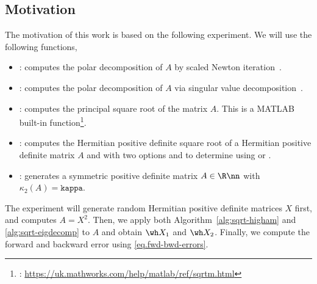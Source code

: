 \subsection{Motivation}
The motivation of this work is based on the following experiment. We will
use the following functions,
\begin{itemize}
\item {}: computes the polar decomposition
of $A$ by scaled Newton iteration~\cite{high-mft}.

\item {}: computes the polar decomposition of
$A$ via singular value decomposition~\cite{high-mft}.

\item {}: computes the principal square root of the
matrix $A$. This is a MATLAB built-in function\footnote{:
  \url{https://uk.mathworks.com/help/matlab/ref/sqrtm.html}}.


\item {}: computes the Hermitian
positive definite square root of a Hermitian positive definite matrix $A$
and with two options  and  to determine
using  or .

\item {}: generates a symmetric positive
definite matrix $A\in\R\nn$ with $\kappa_{2}(A) = \texttt{kappa}$.
\end{itemize}

The experiment will generate random Hermitian positive definite matrices
$X$ first, and computes $A = X^{2}$. Then, we apply both
Algorithm~\ref{alg:sqrt-higham} and \ref{alg:sqrt-eigdecomp} to $A$ and
obtain $\wh X_{1}$ and $\wh X_{2}$.
Finally, we compute the forward and backward error using
\eqref{eq.fwd-bwd-errors}. 

